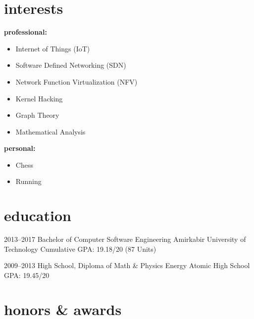 \documentclass[]{friggeri-cv} %
\begin{document}
\section{interests}
\textbf{professional:}
\begin{itemize}
	\item Internet of Things (IoT)
	\item Software Defined Networking (SDN)
	\item Network Function Virtualization (NFV)
	\item Kernel Hacking
	\item Graph Theory
	\item Mathematical Analysis
\end{itemize}
\textbf{personal:}
\begin{itemize}	
	\item Chess
	\item Running
\end{itemize}



\section{education}

\begin{entrylist}


\entry
{2013--2017}
{Bachelor {\normalfont of Computer Software Engineering}}
{Amirkabir University of Technology}
{Cumulative GPA: 19.18/20 (87 Units)}


\entry
{2009--2013}
{High School, {\normalfont Diploma of Math \& Physics}}
{Energy Atomic High School}
{GPA: 19.45/20}



\end{entrylist}


\section{honors \& awards}
\end{document}
